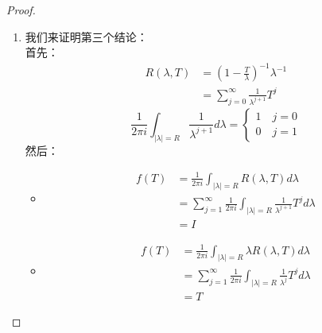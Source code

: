 \documentclass[12pt, a4paper, oneside]{ctexbook}
\begin{document}
\begin{proof}
\begin{enumerate}
\item 我们来证明第三个结论：\\
首先：\begin{align*}
	R(\lambda,T)&=(1-\frac{T}{\lambda})^{-1}\lambda^{-1}\\
	&=\sum_{j=0}^{\infty}\frac{1}{\lambda^{j+1}}T^j
\end{align*}
\begin{equation*}
	\frac{1}{2\pi i}\int _{\left | \lambda \right |=R}\frac{1}{\lambda^{j+1}}d \lambda=\left\{\begin{matrix}
		1 \quad j=0\\ 
		0 \quad j=1
	\end{matrix}\right.
\end{equation*}
然后：
\begin{itemize}
\item \begin{align*}
	f(T)&=\frac{1}{2\pi i}\int _{\left | \lambda\right |=R}R(\lambda,T)d\lambda\\
	&=\sum_{j=1}^{\infty}\frac{1}{2\pi i} \int _{\left | \lambda\right |=R} \frac{1}{\lambda^{j+1}} T^j d \lambda \\
	&=I
\end{align*}
\item \begin{align*}
	f(T)&=\frac{1}{2\pi i}\int _{\left | \lambda\right |=R}\lambda R(\lambda,T)d\lambda\\
	&=\sum_{j=1}^{\infty}\frac{1}{2\pi i} \int _{\left | \lambda\right |=R} \frac{1}{\lambda^{j}} T^j d \lambda \\
	&=T
\end{align*}
\end{itemize}
\end{enumerate}
\end{proof}
\end{document}
